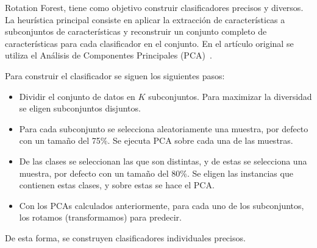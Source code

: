 Rotation Forest, tiene como objetivo construir clasificadores precisos y diversos. La heurística principal consiste en aplicar la extracción de características a subconjuntos de características y reconstruir un conjunto completo de características para cada clasificador en el conjunto. En el artículo original se utiliza el Análisis de Componentes Principales (PCA)~\cite{rotationforest}.

Para construir el clasificador se siguen los siguientes pasos:
\begin{itemize}
	\item Dividir el conjunto de datos en $K$ subconjuntos. Para maximizar la diversidad se eligen subconjuntos disjuntos. 
	\item Para cada subconjunto se selecciona aleatoriamente una muestra, por defecto con un tamaño del 75\%. Se ejecuta PCA sobre cada una de las muestras.
	\item De las clases se seleccionan las que son distintas, y de estas se selecciona una muestra, por defecto con un tamaño del 80\%. Se eligen las instancias que contienen estas clases, y sobre estas se hace el PCA.
	\item Con los PCAs calculados anteriormente, para cada uno de los subconjuntos, los rotamos (transformamos) para predecir.
\end{itemize}

De esta forma, se construyen clasificadores individuales precisos.